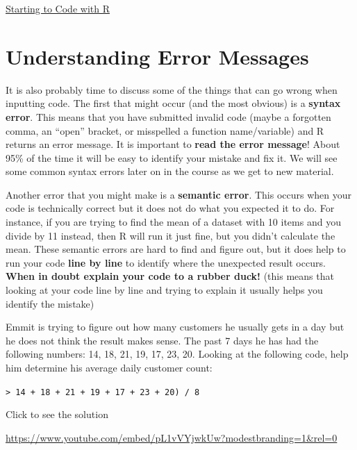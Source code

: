 \documentclass[
  letterpaper,
  DIV=11,
  numbers=noendperiod]{scrreprt}
\begin{document}
\begin{watch}{}{}
    \href{https://youtu.be/Wf7Qwbr9Nko}{Starting to Code with R}
\end{watch}

\section{Understanding Error
Messages}\label{understanding-error-messages}

It is also probably time to discuss some of the things that can go wrong
when inputting code. The first that might occur (and the most obvious)
is a \textbf{syntax error}. This means that you have submitted invalid
code (maybe a forgotten comma, an ``open'' bracket, or misspelled a
function name/variable) and R returns an error message. It is important
to \textbf{read the error message}! About 95\% of the time it will be
easy to identify your mistake and fix it. We will see some common syntax
errors later on in the course as we get to new material.

Another error that you might make is a \textbf{semantic error}. This
occurs when your code is technically correct but it does not do what you
expected it to do. For instance, if you are trying to find the mean of a
dataset with 10 items and you divide by 11 instead, then R will run it
just fine, but you didn't calculate the mean. These semantic errors are
hard to find and figure out, but it does help to run your code
\textbf{line by line} to identify where the unexpected result occurs.
\textbf{When in doubt explain your code to a rubber duck!} (this means
that looking at your code line by line and trying to explain it usually
helps you identify the mistake)

\begin{tcolorbox}[enhanced jigsaw, colbacktitle=quarto-callout-tip-color!10!white, breakable, bottomrule=.15mm, colframe=quarto-callout-tip-color-frame, left=2mm, opacitybacktitle=0.6, title=\textcolor{quarto-callout-tip-color}{\faLightbulb}\hspace{0.5em}{Try it Out}, leftrule=.75mm, opacityback=0, rightrule=.15mm, titlerule=0mm, bottomtitle=1mm, colback=white, toprule=.15mm, arc=.35mm, toptitle=1mm, coltitle=black]

Emmit is trying to figure out how many customers he usually gets in a
day but he does not think the result makes sense. The past 7 days he has
had the following numbers: 14, 18, 21, 19, 17, 23, 20. Looking at the
following code, help him determine his average daily customer count:

\texttt{\textgreater{}\ 14\ +\ 18\ +\ 21\ +\ 19\ +\ 17\ +\ 23\ +\ 20)\ /\ 8}

Click to see the solution

\url{https://www.youtube.com/embed/pL1vVYjwkUw?modestbranding=1&rel=0}

\end{tcolorbox}
\end{document}
